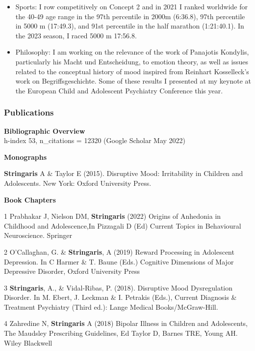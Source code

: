\documentclass[
]{article}
\begin{document}
\begin{itemize}
\item
  Sports: I row competitively on Concept 2 and in 2021 I ranked
  worldwide for the 40-49 age range in the 97th percentile in 2000m
  (6:36.8), 97th percentile in 5000 m (17:49.3), and 91st percentile in
  the half marathon (1:21:40.1). In the 2023 season, I raced 5000 m
  17:56.8.
\item
  Philosophy: I am working on the relevance of the work of Panajotis
  Kondylis, particularly his Macht und Entscheidung, to emotion theory,
  as well as issues related to the conceptual history of mood inspired
  from Reinhart Kosselleck's work on Begriffsgeschichte. Some of these
  results I presented at my keynote at the European Child and Adolescent
  Psychiatry Conference this year.
\end{itemize}

\hypertarget{publications}{%
\subsubsection{Publications}\label{publications}}

\textbf{Bibliographic Overview}\\
h-index 53, n\_citations = 12320 (Google Scholar May 2022)

\textbf{Monographs}

\textbf{Stringaris} A \& Taylor E (2015). Disruptive Mood: Irritability
in Children and Adolescents. New York: Oxford University Press.

\textbf{Book Chapters}

1 Prabhakar J, Nielson DM, \textbf{Stringaris} (2022) Origins of
Anhedonia in Childhood and Adolescence,In Pizzagali D (Ed) Current
Topics in Behavioural Neuroscience. Springer

2 O'Callaghan, G. \& \textbf{Stringaris}, A (2019) Reward Processing in
Adolescent Depression. In C Harmer \& T. Baune (Eds.) Cognitive
Dimensions of Major Depressive Disorder, Oxford University Press

3 \textbf{Stringaris}, A., \& Vidal-Ribas, P. (2018). Disruptive Mood
Dysregulation Disorder. In M. Ebert, J. Leckman \& I. Petrakis (Eds.),
Current Diagnosis \& Treatment Psychiatry (Third ed.): Lange Medical
Books/McGraw-Hill.

4 Zahredine N, \textbf{Stringaris} A (2018) Bipolar Illness in Children
and Adolescents, The Maudsley Prescribing Guidelines, Ed Taylor D,
Barnes TRE, Young AH. Wiley Blackwell
\end{document}
